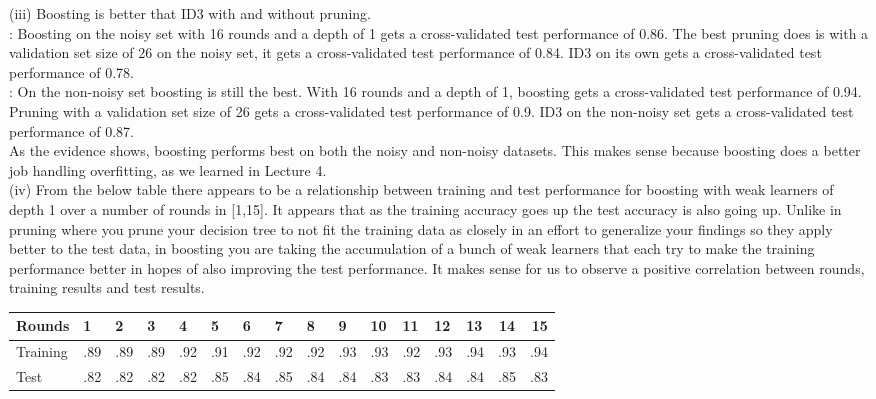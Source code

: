 \documentclass[solution, letterpaper]{cs121}
\begin{document}
(iii) Boosting is better that ID3 with and without pruning. \\
: 
Boosting on the noisy set with 16 rounds and a depth of 1 gets a cross-validated test performance of 0.86.
The best pruning does is with a validation set size of 26 on the noisy set, it gets a cross-validated test performance of 0.84. ID3 on its own gets a cross-validated test performance of 0.78.\\ 
:
On the non-noisy set boosting is still the best. With 16 rounds and a depth of 1, boosting gets a cross-validated test performance of 0.94. Pruning with a validation set size of 26 gets a cross-validated test performance of 0.9. ID3 on the non-noisy set gets a cross-validated test performance of 0.87. \\
\tab As the evidence shows, boosting performs best on both the noisy and non-noisy datasets. This makes sense because boosting does a better job handling overfitting, as we learned in Lecture 4. \\

(iv) From the below table there appears to be a relationship between training and test performance for boosting with weak learners of depth 1 over a number of rounds in [1,15]. It appears that as the training accuracy goes up the test accuracy is also going up. Unlike in pruning where you prune your decision tree to not fit the training data as closely in an effort to generalize your findings so they apply better to the test data, in boosting you are taking the accumulation of a bunch of weak learners that each try to make the training performance better in hopes of also improving the test performance. It makes sense for us to observe a positive correlation between rounds, training results and test results.\\

\begin{tabular}{ l | l l l l l l l l l l l l l c r }
  Rounds & 1 & 2 & 3 & 4 & 5 & 6 & 7 & 8 & 9 & 10 & 11 & 12 & 13 & 14 & 15 \\ \hline
  Training & .89 & .89 & .89 & .92 & .91 & .92 & .92 & .92 & .93 & .93 & .92 & .93 & .94 & .93 & .94 \\
   Test & .82 & .82 & .82 & .82 & .85 & .84 & .85 & .84 & .84 & .83 & .83 & .84 & .84 & .85 & .83 \\
  \end{tabular}

\pagebreak
\end{document}
